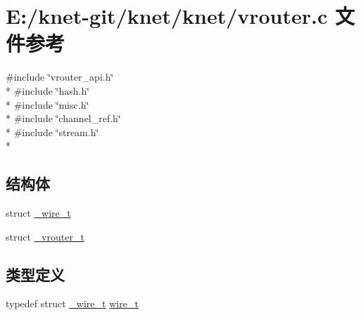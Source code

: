 \hypertarget{a00109}{}\section{E\+:/knet-\/git/knet/knet/vrouter.c 文件参考}
\label{a00109}
{\ttfamily \#include \char`\"{}vrouter\+\_\+api.\+h\char`\"{}}\\*
{\ttfamily \#include \char`\"{}hash.\+h\char`\"{}}\\*
{\ttfamily \#include \char`\"{}misc.\+h\char`\"{}}\\*
{\ttfamily \#include \char`\"{}channel\+\_\+ref.\+h\char`\"{}}\\*
{\ttfamily \#include \char`\"{}stream.\+h\char`\"{}}\\*
\subsection*{结构体}
\begin{DoxyCompactItemize}
\item 
struct \hyperlink{a00041}{\+\_\+wire\+\_\+t}
\item 
struct \hyperlink{a00040}{\+\_\+vrouter\+\_\+t}
\end{DoxyCompactItemize}
\subsection*{类型定义}
\begin{DoxyCompactItemize}
\item 
typedef struct \hyperlink{a00041}{\+\_\+wire\+\_\+t} \hyperlink{a00109_a6e0ed659c10e22fd6106d24779e5ad5c_a6e0ed659c10e22fd6106d24779e5ad5c}{wire\+\_\+t}
\end{DoxyCompactItemize}
